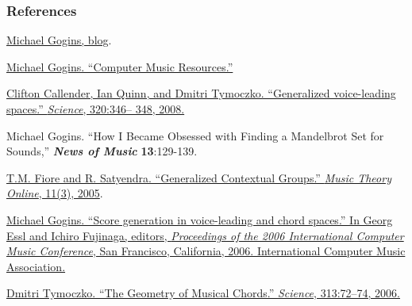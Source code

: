\documentclass{beamer}
\begin{document}
\begin{frame}[allowframebreaks]
  \frametitle<presentation>{References}
    
  \begin{thebibliography}{10}
    
  \beamertemplatebookbibitems

   \href{http://michaelgogins.tumblr.com/}{Michael Gogins, blog}.
  
   \href{https://github.com/gogins/gogins.github.io}{Michael Gogins. ``Computer Music Resources.''}

   \href{http://www.sciencemag.org/content/320/5874/346.abstract}{Clifton Callender, Ian Quinn, and Dmitri Tymoczko. ``Generalized voice-leading spaces.'' \emph{Science}, 320:346–
348, 2008.}

   {Michael Gogins. ``How I Became Obsessed with Finding a Mandelbrot Set for Sounds,'' \textbf{\textit{News of Music}} \textbf{13}:129-139.}

   \href{http://www.mtosmt.org/issues/mto.05.11.3/mto.05.11.3.fiore_satyendra.pdf}{T.M. Fiore and R. Satyendra. ``Generalized Contextual
Groups.'' \emph{Music Theory Online}, 11(3), 2005}.

    \href{https://www.dropbox.com/s/ztej71n2fbn4tq4/Lindenmayer_Systems_Based_on_Riemannian_Transformations.pdf}{Michael Gogins. ``Score generation in voice-leading
and chord spaces.'' In Georg Essl and Ichiro Fujinaga,
editors, \emph{Proceedings of the 2006 International Computer Music Conference}, San Francisco, California,
2006. International Computer Music Association.}

   \href{http://www.sciencemag.org/content/313/5783/72.abstract?ijkey=wzKBea3ktKdu2&keytype=ref&siteid=sci}{Dmitri Tymoczko. ``The Geometry of Musical Chords.'' \emph{Science}, 313:72–74, 2006.}

  \end{thebibliography}

\end{frame}
\end{document}
